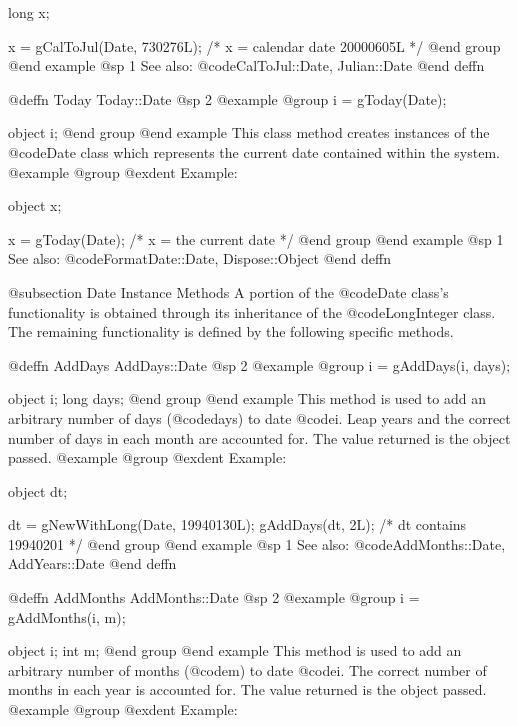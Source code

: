long  x;

x = gCalToJul(Date, 730276L);
    /*  x = calendar date 20000605L */
@end group
@end example
@sp 1
See also:  @code{CalToJul::Date, Julian::Date}
@end deffn






@deffn {Today} Today::Date
@sp 2
@example
@group
i = gToday(Date);

object  i;
@end group
@end example
This class method creates instances of the @code{Date} class which
represents the current date contained within the system.
@example
@group
@exdent Example:

object  x;

x = gToday(Date);   /*  x = the current date  */
@end group
@end example
@sp 1
See also:  @code{FormatDate::Date, Dispose::Object}
@end deffn










@subsection Date Instance Methods
A portion of the @code{Date} class's functionality is obtained through
its inheritance of the @code{LongInteger} class.  The remaining
functionality is defined by the following specific methods.







@deffn {AddDays} AddDays::Date
@sp 2
@example
@group
i = gAddDays(i, days);

object  i;
long    days;
@end group
@end example
This method is used to add an arbitrary number of days (@code{days}) to
date @code{i}.  Leap years and the correct number of days in each month
are accounted for.  The value returned is the object passed.
@example
@group
@exdent Example:

object  dt;

dt = gNewWithLong(Date, 19940130L);
gAddDays(dt, 2L);   /*  dt contains 19940201  */
@end group
@end example
@sp 1
See also:  @code{AddMonths::Date, AddYears::Date}
@end deffn








@deffn {AddMonths} AddMonths::Date
@sp 2
@example
@group
i = gAddMonths(i, m);

object  i;
int     m;
@end group
@end example
This method is used to add an arbitrary number of months (@code{m}) to
date @code{i}.  The correct number of months in each year
is accounted for.  The value returned is the object passed.
@example
@group
@exdent Example:

